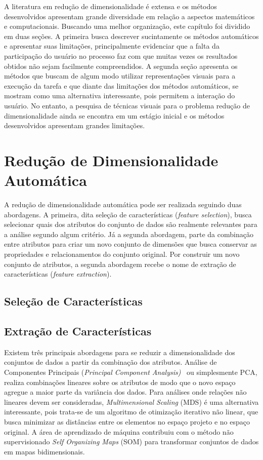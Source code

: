 A literatura em redução de dimensionalidade é extensa e os métodos desenvolvidos apresentam grande diversidade em relação a aspectos matemáticos e computacionais. 
Buscando uma melhor organização, este capítulo foi dividido em duas seções. 
A primeira busca descrever sucintamente os métodos automáticos e apresentar suas limitações, principalmente evidenciar que a falta da participação do usuário no processo faz com que muitas vezes os resultados obtidos não sejam facilmente compreendidos. 
A segunda seção apresenta os métodos que buscam de algum modo utilizar representações visuais para a execução da tarefa e que diante das limitações dos métodos automáticos, se mostram como uma alternativa interessante, pois permitem a interação do usuário. 
No entanto, a pesquisa de técnicas visuais para o problema redução de dimensionalidade ainda se encontra em um estágio inicial e os métodos desenvolvidos apresentam grandes limitações.

\section{Redução de Dimensionalidade Automática}

A redução de dimensionalidade automática pode ser realizada seguindo duas abordagens. A primeira, dita seleção de características (\emph{feature selection}), busca selecionar quais dos atributos do conjunto de dados são realmente relevantes para a análise segundo algum critério. Já a segunda abordagem, parte da combinação entre atributos para criar um novo conjunto de dimensões que busca conservar as propriedades e relacionamentos do conjunto original. Por construir um novo conjunto de atributos, a segunda abordagem recebe o nome de extração de características (\emph{feature extraction}).

\subsection{Seleção de Características}

\subsection{Extração de Características}

Existem três principais abordagens para se reduzir a dimensionalidade dos conjuntos de dados a partir da combinação dos atributos. Análise de Componentes Principais (\textit{Principal Component Analysis)}~ ou simplesmente PCA, realiza combinações lineares sobre os atributos de modo que o novo espaço agregue a maior parte da variância dos dados. Para análises onde relações não lineares devem ser consideradas, \textit{Multimensional Scaling} (MDS) é uma alternativa interessante, pois trata-se de um algoritmo de otimização iterativo não linear, que busca minimizar as distâncias entre os elementos no espaço projeto e no espaço original. A área de aprendizado de máquina contribuiu com o método não supervisionado \textit{Self Organizing Maps} (SOM) para transformar conjuntos de dados em mapas bidimensionais.

